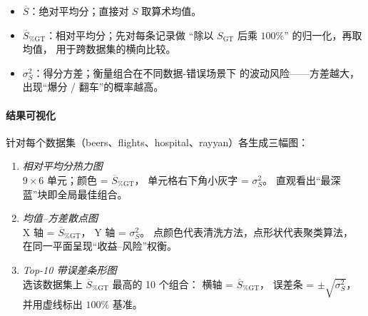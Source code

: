 \documentclass[10pt]{article} %
\numberwithin{equation}{section}
\begin{document}
\begin{itemize}[leftmargin=1.9em]
  \item \(\overline{S}\)：绝对平均分；直接对 \(S\) 取算术均值。
  \item \(\overline{S}_{\%\mathrm{GT}}\)：相对平均分；先对每条记录做
        “除以 \(S_{\mathrm{GT}}\) 后乘 \(100\%\)” 的归一化，再取均值，
        用于跨数据集的横向比较。
  \item \(\sigma^{2}_{S}\)：得分方差；衡量组合在不同数据-错误场景下
        的波动风险——方差越大，出现“爆分 / 翻车”的概率越高。
\end{itemize}

\vspace{0.3em}
\paragraph{结果可视化}
针对每个数据集（beers、flights、hospital、rayyan）各生成三幅图：

\begin{enumerate}[label=\arabic*) ,leftmargin=1.2em]
  \item \emph{相对平均分热力图}\\
        \(9\times6\) 单元；颜色 = \(\overline{S}_{\%\mathrm{GT}}\)，
        单元格右下角小灰字 = \(\sigma^{2}_{S}\)。
        直观看出“最深蓝”块即全局最佳组合。
  \item \emph{均值–方差散点图}\\
        X 轴 = \(\overline{S}_{\%\mathrm{GT}}\)，
        Y 轴 = \(\sigma^{2}_{S}\)。
        点颜色代表清洗方法，点形状代表聚类算法，
        在同一平面呈现“收益–风险”权衡。
  \item \emph{Top-10 带误差条形图}\\
        选该数据集上 \(\overline{S}_{\%\mathrm{GT}}\) 最高的 10 个组合：
        横轴 = \(\overline{S}_{\%\mathrm{GT}}\)，
        误差条 = \(\pm\sqrt{\sigma^{2}_{S}}\)，并用虚线标出 \(100\%\) 基准。
\end{enumerate}
\end{document}
